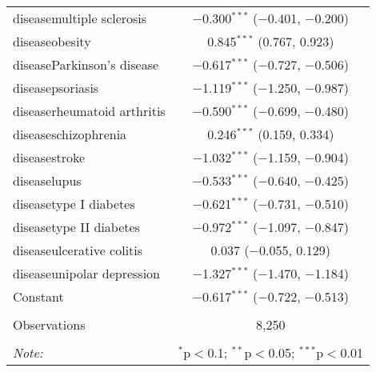 \begin{table}[!htbp]
\begin{tabular}{@{\extracolsep{5pt}}lc}
  diseasemultiple sclerosis & $-$0.300$^{***}$ ($-$0.401, $-$0.200) \\ 
  diseaseobesity & 0.845$^{***}$ (0.767, 0.923) \\ 
  diseaseParkinson's disease & $-$0.617$^{***}$ ($-$0.727, $-$0.506) \\ 
  diseasepsoriasis & $-$1.119$^{***}$ ($-$1.250, $-$0.987) \\ 
  diseaserheumatoid arthritis & $-$0.590$^{***}$ ($-$0.699, $-$0.480) \\ 
  diseaseschizophrenia & 0.246$^{***}$ (0.159, 0.334) \\ 
  diseasestroke & $-$1.032$^{***}$ ($-$1.159, $-$0.904) \\ 
  diseaselupus & $-$0.533$^{***}$ ($-$0.640, $-$0.425) \\ 
  diseasetype I diabetes & $-$0.621$^{***}$ ($-$0.731, $-$0.510) \\ 
  diseasetype II diabetes & $-$0.972$^{***}$ ($-$1.097, $-$0.847) \\ 
  diseaseulcerative colitis & 0.037 ($-$0.055, 0.129) \\ 
  diseaseunipolar depression & $-$1.327$^{***}$ ($-$1.470, $-$1.184) \\ 
  Constant & $-$0.617$^{***}$ ($-$0.722, $-$0.513) \\ 
 \hline \\[-1.8ex] 
Observations & 8,250 \\ 
\hline 
\hline \\[-1.8ex] 
\textit{Note:}  & \multicolumn{1}{r}{$^{*}$p$<$0.1; $^{**}$p$<$0.05; $^{***}$p$<$0.01} \\ 
\end{tabular} 
\end{table} 
